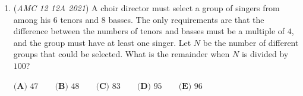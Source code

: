 \begin{enumerate}
 Observe that $\sum_{k=1}^{20} \log_{5^k} 3^{k^2} >> \sum_{k=2}^{20} 1 = 19$ and $\sum_{k=1}^{100} \log_{9^k} 25^k\approx\sum_{k=1}^{100} \log_{9^k} 27^k = \sum_{k=1}^{100} \frac{3}{2} = 150.$ Therefore, we obtain the following rough underestimation: 
 \[\left(\sum_{k=1}^{20} \log_{5^k} 3^{k^2}\right)\cdot\left(\sum_{k=1}^{100} \log_{9^k} 25^k\right)>\left(\sum_{k=2}^{20} 1\right)\cdot\left(\sum_{k=1}^{100} \frac{3}{2}\right)=19\cdot150=2{,}850.\]From here, it should be safe to guess that the answer is $\textbf{(E)}.$




\textbf{Solution 5 (Properties of Logarithms)}

Using the identity 
 \[\log_{p^n}{q^n}=\log_{p}{q},\] simplify 
 \begin{align*} \log_{5^k}{{3^k}^2}&=\log_{5^k}{(3^k)^k} \\ &=\log_{5}{3^k} \\ \end{align*}
and 
 \begin{align*} \log_{9^k}{25^k}&=\log_{3^{2k}}{5^{2k}} \\ &=\log_{3}{5}. \end{align*}
. Now we have the product: 
 \[\left(\sum_{k=1}^{20} \log_{5} 3^{k}\right)\cdot\left(\sum_{k=1}^{100} \log_{3} 5\right)\] 
 \begin{align*} \sum_{k=1}^{20} \log_{5} 3^k &= \log_{5} 3^1 + \log_{5} 3^2 + \dots + \log_{5} 3^{20} \\ &= \log_{5} 3^{(1 + 2 + \dots + 20)} \\ &= \log_{5} 3^{\frac{20(20+1)}{2}} \\ &= \log_{5} 3^{210} \\ &= {210}\cdot\log_{5} {3}, \\ \sum_{k=1}^{100}\log_{3} {5} &= {100}\cdot\log_{3} {5}. \end{align*}
 With the reciprocal rule the logarithms cancel out leaving: $\boxed{\textbf{(E) }21{,}000}.$



	\item (\textit{AMC 12 12A 2021}) A choir director must select a group of singers from among his $6$ tenors and $8$ basses. The only
requirements are that the difference between the numbers of tenors and basses must be a multiple
of $4$, and the group must have at least one singer. Let $N$ be the number of different groups that could be
selected. What is the remainder when $N$ is divided by $100$?


 $\textbf{(A) } 47\qquad\textbf{(B) } 48\qquad\textbf{(C) } 83\qquad\textbf{(D) } 95\qquad\textbf{(E) } 96\qquad$


\end{enumerate}
